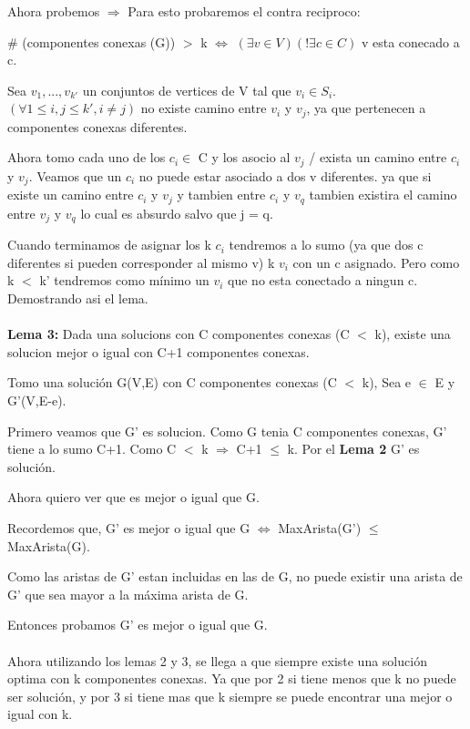 Ahora probemos $\Rightarrow$
Para esto probaremos el contra reciproco:

$\#$ (componentes conexas (G)) $>$ k  $\Leftrightarrow$ $(\exists v \in V)(! \exists c \in C)$ v esta conecado a c. 

Sea ${v_1,...,v_{k'}}$ un conjuntos de vertices de V tal que $v_i \in S_i$. $(\forall 1 \leq i,j \leq k', i \neq j)$ no existe camino entre $v_i$ y $v_j$, ya que pertenecen a componentes conexas diferentes.

Ahora tomo cada uno de los $c_i \in$ C y los asocio al $v_j$ / exista un camino entre $c_i$ y $v_j$. Veamos que un $c_i$ no puede estar asociado a dos v diferentes. ya que si existe un camino entre $c_i$ y $v_j$ y tambien entre $c_i$ y $v_q$ tambien existira el camino entre $v_j$ y $v_q$ lo cual es absurdo salvo que j = q.

Cuando terminamos de asignar los k $c_i$ tendremos a lo sumo (ya que dos c diferentes si pueden corresponder al mismo v) k $v_i$ con un c asignado. Pero como k $<$ k' tendremos como mínimo un $v_i$ que no esta conectado a ningun c. Demostrando asi el lema. \\ \\


\textbf{Lema 3:} Dada una solucions con C componentes conexas (C $<$ k), existe una solucion mejor o igual con C+1 componentes conexas.

Tomo una solución G(V,E) con C componentes conexas (C $<$ k), Sea e $\in$ E y G'(V,E-e).

Primero veamos que G' es solucion. Como G tenia C componentes conexas, G' tiene a lo sumo C+1. Como C $<$ k $\Rightarrow$ C+1 $\leq$ k. Por el \textbf{Lema 2} G' es solución.

Ahora quiero ver que es mejor o igual que G.

Recordemos que, G' es mejor o igual que G $\Leftrightarrow$ MaxArista(G') $\leq$ MaxArista(G).

Como las aristas de G' estan incluidas en las de G, no puede existir una arista de G' que sea mayor a la máxima arista de G.

Entonces probamos G' es mejor o igual que G. \\ \\

Ahora utilizando los lemas 2 y 3, se llega a que siempre existe una solución optima con k componentes conexas.
Ya que por 2 si tiene menos que k no puede ser solución, y por 3 si tiene mas que k siempre se puede encontrar una mejor o igual con k.

